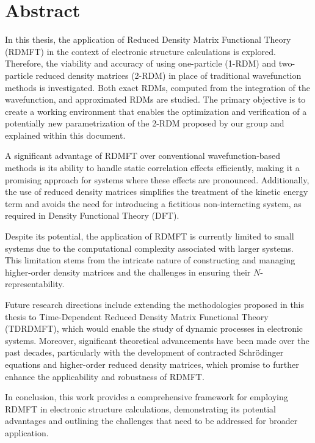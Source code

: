 \section*{Abstract}
In this thesis, the application of Reduced Density Matrix 
Functional Theory (RDMFT) in the context of electronic structure calculations
is explored.
Therefore, the viability and 
accuracy of using one-particle (1-RDM) and two-particle reduced density 
matrices (2-RDM) in place of traditional wavefunction methods is investigated.
Both exact RDMs, computed from the integration of the wavefunction, and
approximated RDMs are studied.
The primary objective is to create a working environment that 
enables the optimization and verification of a potentially new parametrization
of the 2-RDM proposed by our group and explained within this document.

A significant advantage of RDMFT over conventional wavefunction-based methods 
is its ability to handle static correlation effects efficiently, making it a 
promising approach for systems where these effects are pronounced.
Additionally, the use of reduced density matrices simplifies the treatment of 
the kinetic energy term and avoids the need for introducing a fictitious non-interacting
system, as required in Density Functional Theory (DFT).

Despite its potential, the application of RDMFT is currently limited to small 
systems due to the computational complexity associated with larger systems.
This limitation stems from the intricate nature of constructing and managing 
higher-order density matrices and the challenges in ensuring their $N$-representability.

Future research directions include extending the methodologies proposed in 
this thesis to Time-Dependent Reduced Density Matrix Functional Theory (TDRDMFT),
which would enable the study of dynamic processes in electronic systems.
Moreover, significant theoretical advancements have been made over the past 
decades, particularly with the development of contracted Schrödinger equations 
and higher-order reduced density matrices, which promise to 
further enhance the applicability and robustness of RDMFT.

In conclusion, this work provides a comprehensive framework for employing 
RDMFT in electronic structure calculations, demonstrating its potential 
advantages and outlining the challenges that need to be addressed for broader application.

